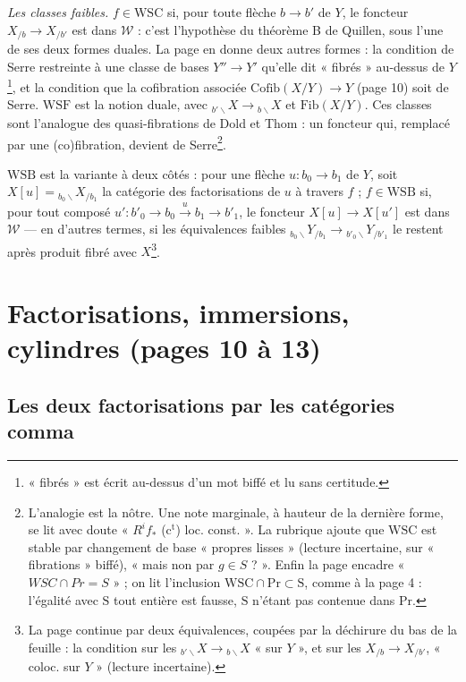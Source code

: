 \documentclass[11pt,a4paper]{article}
\begin{document}
\emph{Les classes faibles.} $f \in \mathrm{WSC}$ si, pour toute flèche
$b \to b'$ de $Y$, le foncteur $X_{/b} \to X_{/b'}$ est dans
$\mathcal{W}$ : c'est l'hypothèse du théorème B de Quillen, sous l'une de ses
deux formes duales. La page en donne deux autres formes : la condition de
Serre restreinte à une classe de bases $Y'' \to Y'$ qu'elle dit « fibrés »
au-dessus de $Y$\footnote{« fibrés » est écrit au-dessus d'un mot biffé et lu
sans certitude.}, et la condition que la cofibration associée
$\mathrm{Cofib}(X/Y) \to Y$ (page 10) soit de Serre. $\mathrm{WSF}$ est la
notion duale, avec ${}_{b'\backslash}X \to {}_{b\backslash}X$ et
$\mathrm{Fib}(X/Y)$. Ces classes sont l'analogue des quasi-fibrations de Dold
et Thom : un foncteur qui, remplacé par une (co)fibration, devient de
Serre\footnote{L'analogie est la nôtre. Une note marginale, à hauteur de la
dernière forme, se lit avec doute « $R^{i}f_{*}$ (c$^{\mathrm{t}}$)
loc. const. ». La rubrique ajoute que $\mathrm{WSC}$ est stable par changement
de base « propres lisses » (lecture incertaine, sur « fibrations » biffé),
« mais non par $g \in S$ ? ». Enfin la page encadre « $WSC \cap Pr = S$ » ; on
lit l'inclusion $\mathrm{WSC} \cap \mathrm{Pr} \subset \mathrm{S}$, comme à la
page 4 : l'égalité avec $\mathrm{S}$ tout entière est fausse, $\mathrm{S}$
n'étant pas contenue dans $\mathrm{Pr}$.}.

$\mathrm{WSB}$ est la variante à deux côtés : pour une flèche $u : b_{0} \to
b_{1}$ de $Y$, soit $X[u] = {}_{b_{0}\backslash}X_{/b_{1}}$ la catégorie des
factorisations de $u$ à travers $f$ ; $f \in \mathrm{WSB}$ si, pour tout
composé $u' : b'_{0} \to b_{0} \xrightarrow{u} b_{1} \to b'_{1}$, le foncteur
$X[u] \to X[u']$ est dans $\mathcal{W}$ --- en d'autres termes, si les
équivalences faibles ${}_{b_{0}\backslash}Y_{/b_{1}} \to
{}_{b'_{0}\backslash}Y_{/b'_{1}}$ le restent après produit fibré avec
$X$\footnote{La page continue par deux équivalences, coupées par la
déchirure du bas de la feuille : la condition sur les ${}_{b'\backslash}X \to
{}_{b\backslash}X$ « sur $Y$ », et sur les $X_{/b} \to X_{/b'}$, « coloc. sur
$Y$ » (lecture incertaine).}.

\section*{Factorisations, immersions, cylindres (pages 10 à 13)}

\subsection*{Les deux factorisations par les catégories comma}
\end{document}

